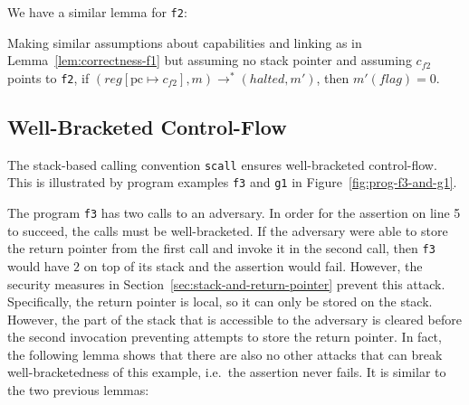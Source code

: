 \documentclass[format=acmsmall, review=true, screen=true]{acmart}
\renewcommand{\figurename}{Figure}
\renewcommand{\sectionname}{Section}
\newcommand{\update}[2]{[#1 \mapsto #2]}
\newcommand{\var}[1]{\mathit{#1}}
\newcommand{\pcreg}{\mathrm{pc}}
\newcommand{\reg}{\var{reg}}
\newcommand{\flag}{\var{flag}}
\newcommand{\halted}{\mathit{halted}}
\newcommand{\step}[1][]{\rightarrow_{#1}}
\begin{document}
We have a similar lemma for \texttt{f2}:
\begin{lemma}
  \label{lem:correctness-f2}
  Making similar assumptions about capabilities and linking as in
  Lemma~\ref{lem:correctness-f1} but assuming no stack pointer and assuming $c_{f2}$ points to \texttt{f2},
  if $(\reg\update{\pcreg}{c_{f2}},m) \step^* (\halted,m')$, then $m'(\flag) = 0$.
\end{lemma}

\subsection{Well-Bracketed Control-Flow} 
The stack-based calling convention \texttt{scall} ensures well-bracketed control-flow.
This is illustrated by program examples \texttt{f3} and \texttt{g1} in \figurename~\ref{fig:prog-f3-and-g1}.

The program \texttt{f3} has two calls to an adversary.
In order for the assertion on line 5 to succeed, the calls must be well-bracketed.
If the adversary were able to store the return pointer from the first call and invoke it in the second call, then \texttt{f3} would have $2$ on top of its stack and the assertion would fail.
However, the security measures in \sectionname~\ref{sec:stack-and-return-pointer} prevent this attack.
Specifically, the return pointer is local, so it can only be stored on the stack.
However, the part of the stack that is accessible to the adversary is cleared before the second invocation preventing attempts to store the return pointer.
In fact, the following lemma shows that there are also no other attacks that can break well-bracketedness of this example, i.e.\ the assertion never fails.
It is similar to the two previous lemmas:
\end{document}
